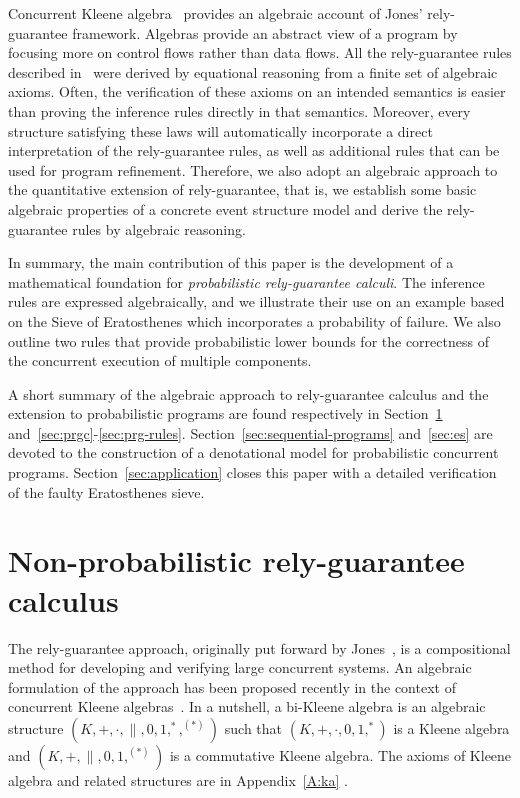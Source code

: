 \documentclass[review]{elsart}
\begin{document}
Concurrent Kleene algebra~\cite{Hoa11,Arm14} provides an algebraic account of Jones' rely-guarantee framework. Algebras provide an abstract view of a program by focusing more on control flows rather than data flows. All the rely-guarantee rules described in~\cite{Hoa11,Arm14} were derived by equational reasoning from a finite set of algebraic axioms. Often, the verification of these axioms on an intended semantics is easier than proving the inference rules directly in that semantics. Moreover, every structure satisfying these laws will automatically incorporate a direct interpretation of the rely-guarantee rules, as well as additional rules that can be used for program refinement. Therefore, we also adopt an algebraic approach to the quantitative extension of rely-guarantee, that is, we establish some basic algebraic properties of a concrete event structure model and derive the rely-guarantee rules by algebraic reasoning.

In summary, the main contribution of this paper is the development of a mathematical foundation for \textit{probabilistic rely-guarantee calculi}. The inference rules are expressed algebraically, and we illustrate their use on an example based on the Sieve of Eratosthenes which incorporates a probability of failure. We also outline two rules that provide probabilistic lower bounds for the correctness of the concurrent execution of multiple components. 

A short summary of the algebraic approach to rely-guarantee calculus and the extension to probabilistic programs are found respectively in Section~\ref{sec:standard-rg} and~\ref{sec:prgc}-\ref{sec:prg-rules}. Section~\ref{sec:sequential-programs} and~\ref{sec:es} are devoted to the construction of a denotational model for probabilistic concurrent programs.
Section~\ref{sec:application} closes this paper with a detailed verification of the faulty Eratosthenes sieve. 





\section{Non-probabilistic rely-guarantee calculus}\label{sec:standard-rg}
The rely-guarantee approach, originally put forward by Jones~\cite{Jon81}, is a compositional method for developing and verifying large concurrent systems. An algebraic formulation of the approach has been proposed recently in the context of concurrent Kleene algebras~\cite{Hoa11}.  In a nutshell, a bi-Kleene algebra is an algebraic structure $(K,+,\cdot,\|,0,1,^\ast,^{(\ast)})$ such that $(K,+,\cdot,0,1,^\ast)$ is a Kleene algebra and $(K,+,\|,0,1,^{(\ast)})$ is a commutative Kleene algebra. The axioms of Kleene algebra and related structures are in Appendix~\ref{A:ka} 
.
\end{document}
